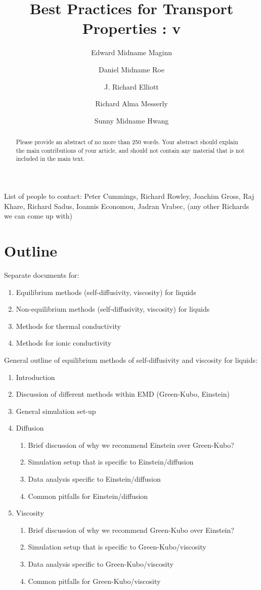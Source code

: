 \documentclass[9pt]{livecoms}
\title{Best Practices for Transport Properties : v\versionnumber}
\author[1*,\authfn{1}\authfn{3}]{Edward Midname Maginn}
\author[2\authfn{1}\authfn{4}]{Daniel Midname Roe}
\author[3\authfn{1}\authfn{5}]{J. Richard Elliott}
\author[4\authfn{1}\authfn{6}]{Richard Alma Messerly}
\author[5\authfn{1}\authfn{7}]{Sunny Midname Hwang}
\affil[1]{Maginn's institution}
\affil[2]{Roe's institution}
\affil[3]{Elliott's institution}
\affil[4]{National Institute of Standards and Technology}
\affil[5]{Hwang's institution}
\begin{document}
\maketitle

\begin{abstract}
Please provide an abstract of no more than 250 words. Your abstract should explain the main contributions of your article, and should not contain any material that is not included in the main text.
\end{abstract}

List of people to contact: Peter Cummings, Richard Rowley, Joachim Gross, Raj Khare, Richard Sadus, Ioannis Economou, Jadran Vrabec, (any other Richards we can come up with)


\section{Outline}

Separate documents for:
\begin{enumerate}
	\item Equilibrium methods (self-diffusivity, viscosity) for liquids
	\item Non-equilibrium methods (self-diffusivity, viscosity) for liquids
	\item Methods for thermal conductivity
	\item Methods for ionic conductivity
\end{enumerate}

General outline of equilibrium methods of self-diffusivity and viscosity for liquids:
\begin{enumerate}
	\item Introduction
	\item Discussion of different methods within EMD (Green-Kubo, Einstein)
	\item General simulation set-up
	\item Diffusion
	\begin{enumerate}
		\item Brief discussion of why we recommend Einstein over Green-Kubo?
		\item Simulation setup that is specific to Einstein/diffusion
		\item Data analysis specific to Einstein/diffusion
		\item Common pitfalls for Einstein/diffusion
	\end{enumerate}
	\item Viscosity
	\begin{enumerate}
		\item Brief discussion of why we recommend Green-Kubo over Einstein?
		\item Simulation setup that is specific to Green-Kubo/viscosity
		\item Data analysis specific to Green-Kubo/viscosity
		\item Common pitfalls for Green-Kubo/viscosity
	\end{enumerate}
\end{enumerate}
\end{document}
